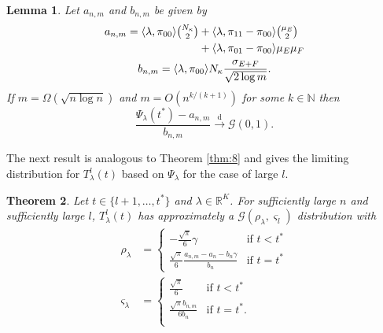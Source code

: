 \documentclass[10pt,journal,compsoc]{IEEEtran}
\newtheorem{theorem}{Theorem}
\newtheorem{lemma}[theorem]{Lemma}
\theoremstyle{definition}
\begin{document}
\begin{lemma}
  \label{lem:6}
  Let $a_{n,m}$ and $b_{n,m}$ be given by
  \begin{gather}
    \label{eq:28}
    \begin{split}
    a_{n,m} =%
\langle \lambda, \pi_{00} \rangle \tbinom{N_\kappa}{2} &+
\langle \lambda, \pi_{11} - \pi_{00} \rangle
\tbinom{\mu_E}{2} \\ &+ \langle \lambda, \pi_{01} - \pi_{00} \rangle \mu_E \mu_F 
    \end{split} \\
    b_{n,m} = \langle \lambda, \pi_{00} \rangle N_\kappa \frac{\sigma_{E + F}}{\sqrt{2
        \log{m}}}.
  \end{gather}
  If $m = \Omega(\sqrt{n \log n})$ and $m = O(n^{k/(k+1)})$ for some
  $k \in \mathbb{N}$ then
  \begin{equation}
    \label{eq:29}
    \frac{\Psi_{\lambda}(t^{*}) - a_{n,m}}{b_{n,m}}
    \overset{\mathrm{d}}{\longrightarrow} \mathcal{G}(0,1).
  \end{equation}
\end{lemma}
The next result is analogous to Theorem \ref{thm:8} and gives 
the limiting distribution for
$T_{\lambda}^{l}(t)$ based on $\Psi_{\lambda}$ for the case of large
$l$.
\begin{theorem}
  \label{thm:6}
  Let $t \in \{l+1, \dots, t^{*}\} $ and $\lambda \in
  \mathbb{R}^{K}$. For sufficiently large $n$ and sufficiently large
  $l$, $T_{\lambda}^{l}(t)$ has approximately a
  $\mathcal{G}(\rho_{\lambda}, \varsigma_{l})$ distribution with
  \begin{align}
    \label{eq:52}
    \rho_{\lambda} &= \begin{cases}
      - \tfrac{\sqrt{\pi}}{6} \gamma & \text{if $t < t^{*}$} \\
      \tfrac{\sqrt{\pi}}{6} \tfrac{a_{n,m} - a_n - b_n \gamma}{b_n} & \text{if
        $t = t^{*}$} 
    \end{cases} \\
      \varsigma_{\lambda} &= \begin{cases}
        \tfrac{\sqrt{\pi}}{6} & \text{if $t < t^{*}$} \\
        \tfrac{\sqrt{\pi} b_{n,m}}{6 b_n} & \text{if $t = t^{*}$}. \\
      \end{cases}
  \end{align}
\end{theorem}
\end{document}
